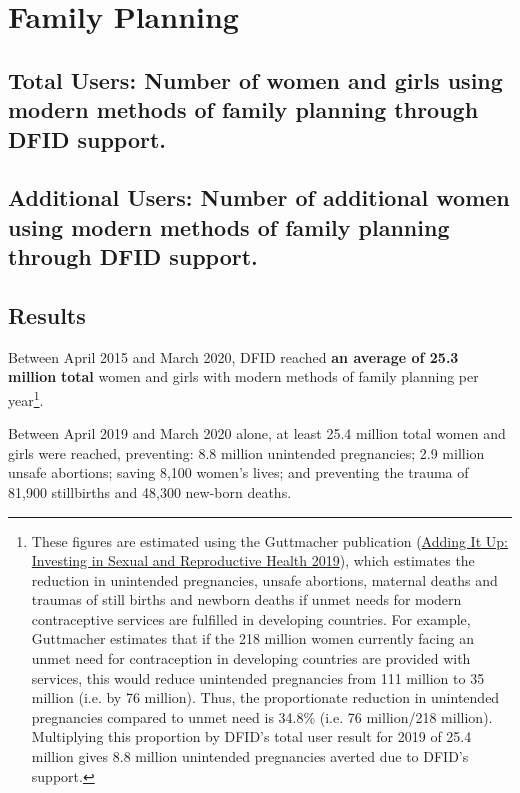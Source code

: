 \chapter{Family Planning}

\section*{Total Users: Number of women and girls using modern methods of family planning through DFID support.}

\section*{Additional Users: Number of additional women using modern methods of family planning through DFID support.}


\thispagestyle{empty}


\section{Results}

Between April 2015 and March 2020, DFID reached \textbf{
an average of 25.3 million
} \textbf{total} women and girls with modern methods of family planning per year\footnote{These figures are estimated using the Guttmacher publication (\href{https://www.guttmacher.org/report/adding-it-up-investing-in-sexual-reproductive-health-2019-methodology}{Adding It Up: Investing in Sexual and Reproductive Health 2019}), which estimates the reduction in unintended pregnancies, unsafe abortions, maternal deaths and traumas of still births and newborn deaths if unmet needs for modern contraceptive services are fulfilled in developing countries. For example, Guttmacher estimates that if the 218 million women currently facing an unmet need for contraception in developing countries are provided with services, this would reduce unintended pregnancies from 111 million to 35 million (i.e. by 76 million). Thus, the proportionate reduction in unintended pregnancies compared to unmet need is 34.8\% (i.e. 76 million/218 million). Multiplying this proportion by DFID's total user result for 2019 of 25.4 million gives 8.8 million unintended pregnancies averted due to DFID's support.}. %

Between April 2019 and March 2020 alone, at least
25.4
million total women and girls were reached, preventing: 8.8 million unintended pregnancies; 2.9 million unsafe abortions; saving 8,100 women's lives; and preventing the trauma of 81,900 stillbirths and 48,300 new-born deaths. %

